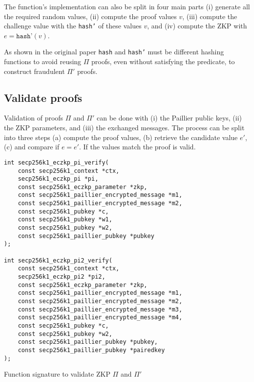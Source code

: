 The function's implementation can also be split in four main parts (i) generate
all the required random values, (ii) compute the proof values $v$, (iii) compute
the challenge value with the \texttt{hash'} of these values $v$, and (iv)
compute the ZKP with $e = \texttt{hash'}(v)$.

As shown in the original paper \texttt{hash} and \texttt{hash'} must be different
hashing functions to avoid reusing $\Pi$ proofs, even without satisfying the
predicate, to construct fraudulent $\Pi'$ proofs.

\subsection{Validate proofs}

Validation of proofs $\Pi$ and $\Pi'$ can be done with (i) the Paillier public
keys, (ii) the ZKP parameters, and (iii) the exchanged messages. The process can
be split into three steps (a) compute the proof values, (b) retrieve the candidate
value $e'$, (c) and compare if $e = e'$. If the values match the proof is valid.

\begin{longlisting}
  \begin{verbatim}
int secp256k1_eczkp_pi_verify(
    const secp256k1_context *ctx,
    secp256k1_eczkp_pi *pi,
    const secp256k1_eczkp_parameter *zkp,
    const secp256k1_paillier_encrypted_message *m1,
    const secp256k1_paillier_encrypted_message *m2,
    const secp256k1_pubkey *c,
    const secp256k1_pubkey *w1,
    const secp256k1_pubkey *w2,
    const secp256k1_paillier_pubkey *pubkey
);

int secp256k1_eczkp_pi2_verify(
    const secp256k1_context *ctx,
    secp256k1_eczkp_pi2 *pi2,
    const secp256k1_eczkp_parameter *zkp,
    const secp256k1_paillier_encrypted_message *m1,
    const secp256k1_paillier_encrypted_message *m2,
    const secp256k1_paillier_encrypted_message *m3,
    const secp256k1_paillier_encrypted_message *m4,
    const secp256k1_pubkey *c,
    const secp256k1_pubkey *w2,
    const secp256k1_paillier_pubkey *pubkey,
    const secp256k1_paillier_pubkey *pairedkey
);
  \end{verbatim}
	\caption{Function signature to validate ZKP $\Pi$ and $\Pi'$}
	\label{lst:funcSigValidatePiPi2}
\end{longlisting}


